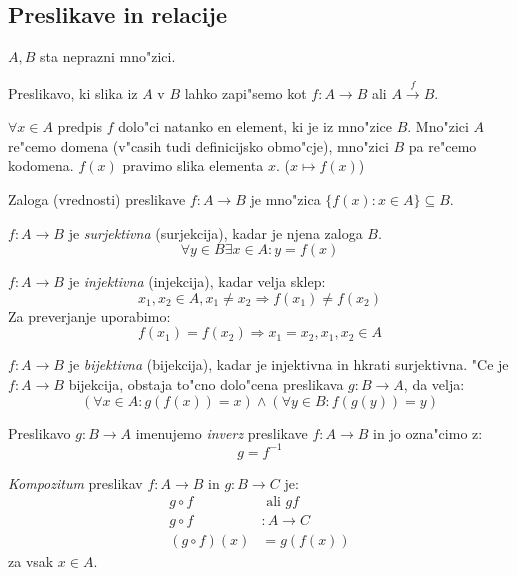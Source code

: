 \subsection{Preslikave in relacije}
$A, B$ sta neprazni mno"zici.

Preslikavo, ki slika iz $A$ v $B$ lahko zapi"semo kot $f: A \rightarrow B$ ali $A \stackrel{f}{\rightarrow} B$.

$\forall x \in A$ predpis $f$ dolo"ci natanko en element, ki je iz mno"zice $B$. Mno"zici $A$ re"cemo domena (v"casih tudi definicijsko obmo"cje), mno"zici $B$ pa re"cemo kodomena. $f(x)$ pravimo slika elementa $x$. ($x \mapsto f(x)$)

Zaloga (vrednosti) preslikave $f: A \rightarrow B$ je mno"zica $\{f(x): x \in A\} \subseteq B$.

$f: A \rightarrow B$ je \emph{surjektivna} (surjekcija), kadar je njena zaloga $B$.
\begin{equation*}
\forall y \in B \exists x \in A: y = f(x)
\end{equation*}

$f: A \rightarrow B$ je \emph{injektivna} (injekcija), kadar velja sklep:
\begin{equation*}
x_1, x_2 \in A, x_1 \neq x_2 \Rightarrow f(x_1) \neq f(x_2)
\end{equation*}
Za preverjanje uporabimo:
\begin{equation*}
f(x_1) = f(x_2) \Rightarrow x_1 = x_2, x_1, x_2 \in A
\end{equation*}

$f: A \rightarrow B$ je \emph{bijektivna} (bijekcija), kadar je injektivna in hkrati surjektivna. "Ce je $f: A \rightarrow B$ bijekcija, obstaja to"cno dolo"cena preslikava $g: B \rightarrow A$, da velja:
\begin{equation*}
(\forall x \in A: g(f(x)) = x) \land (\forall y \in B: f(g(y)) = y)
\end{equation*}

Preslikavo $g: B \rightarrow A$ imenujemo \emph{inverz} preslikave $f: A \rightarrow B$ in jo ozna"cimo z:
\begin{equation*}
g = f^{-1}
\end{equation*}

\emph{Kompozitum} preslikav $f: A \rightarrow B$ in $g: B \rightarrow C$ je:
\begin{align*}
g \circ f &\text{ ali } gf\\
g \circ f &: A \rightarrow C\\
(g \circ f)(x) &= g(f(x))
\end{align*}
za vsak $x \in A$.

